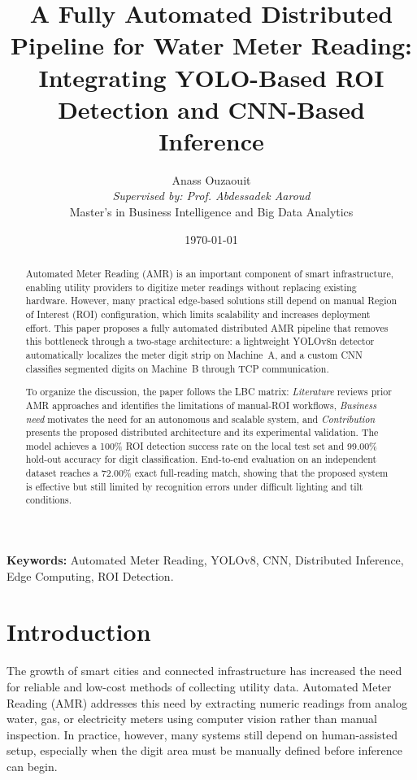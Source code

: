 \documentclass[11pt,a4paper]{article}
\title{\textbf{A Fully Automated Distributed Pipeline for Water Meter Reading: Integrating YOLO-Based ROI Detection and CNN-Based Inference}}
\author{Anass Ouzaouit \\ \textit{Supervised by: Prof. Abdessadek Aaroud} \\ Master's in Business Intelligence and Big Data Analytics}
\date{\today}
\begin{document}
\maketitle

\begin{abstract}
Automated Meter Reading (AMR) is an important component of smart infrastructure, enabling utility providers to digitize meter readings without replacing existing hardware. However, many practical edge-based solutions still depend on manual Region of Interest (ROI) configuration, which limits scalability and increases deployment effort. This paper proposes a fully automated distributed AMR pipeline that removes this bottleneck through a two-stage architecture: a lightweight YOLOv8n detector automatically localizes the meter digit strip on Machine~A, and a custom CNN classifies segmented digits on Machine~B through TCP communication.

To organize the discussion, the paper follows the LBC matrix: \textit{Literature} reviews prior AMR approaches and identifies the limitations of manual-ROI workflows, \textit{Business need} motivates the need for an autonomous and scalable system, and \textit{Contribution} presents the proposed distributed architecture and its experimental validation. The model achieves a 100\% ROI detection success rate on the local test set and 99.00\% hold-out accuracy for digit classification. End-to-end evaluation on an independent dataset reaches a 72.00\% exact full-reading match, showing that the proposed system is effective but still limited by recognition errors under difficult lighting and tilt conditions.
\end{abstract}

\textbf{Keywords:} Automated Meter Reading, YOLOv8, CNN, Distributed Inference, Edge Computing, ROI Detection.

\vspace{1em}

\section{Introduction}
The growth of smart cities and connected infrastructure has increased the need for reliable and low-cost methods of collecting utility data. Automated Meter Reading (AMR) addresses this need by extracting numeric readings from analog water, gas, or electricity meters using computer vision rather than manual inspection. In practice, however, many systems still depend on human-assisted setup, especially when the digit area must be manually defined before inference can begin.
\end{document}
